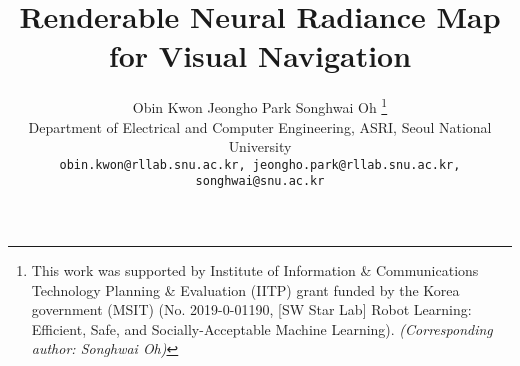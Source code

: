 \documentclass[10pt,twocolumn,letterpaper]{article}
\newcommand{\customspace}{\hspace*{15pt}}
\begin{document}
\title{Renderable Neural Radiance Map for Visual Navigation}


\author{
Obin Kwon \customspace
Jeongho Park \customspace
Songhwai Oh 
\thanks{This work was supported by Institute of Information \& Communications Technology Planning \& Evaluation (IITP) grant funded by the Korea government (MSIT) (No. 2019-0-01190, [SW Star Lab] Robot Learning: Efficient, Safe, and Socially-Acceptable Machine Learning). \textit{(Corresponding author: Songhwai Oh)}}
\customspace
\\
Department of Electrical and Computer Engineering, ASRI, Seoul National University
\\
{\tt\small obin.kwon@rllab.snu.ac.kr, jeongho.park@rllab.snu.ac.kr, songhwai@snu.ac.kr}
\\}
\maketitle
\end{document}
